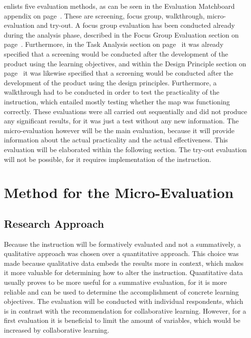 \documentclass[11pt,twoside]{report} %
\begin{document}
 enlists five evaluation methods, as can be seen in the Evaluation Matchboard appendix on page~\pageref{app:evamatchboard}. These are screening, focus group, walkthrough, micro-evaluation and try-out. A focus group evaluation has been conducted already during the analysis phase, described in the Focus Group Evaluation section on page~\pageref{ch:focusgroup}. Furthermore, in the Task Analysis section on page~\pageref{subch:testspecifications} it was already specified that a screening would be conducted after the development of the product using the learning objectives, and within the Design Principle section on page~\pageref{ch:designprinciples} it was likewise specified that a screening would be conducted after the development of the product using the design principles. Furthermore, a walkthrough had to be conducted in order to test the practicality of the instruction, which entailed mostly testing whether the map was functioning correctly. These evaluations were all carried out sequentially and did not produce any significant results, for it was just a test without any new information. The micro-evaluation however will be the main evaluation, because it will provide information about the actual practicality and the actual effectiveness. This evaluation will be elaborated within the following section. The try-out evaluation will not be possible, for it requires implementation of the instruction.

\chapter{Method for the Micro-Evaluation}
\label{ch:methodevaluation}

\section{Research Approach}

Because the instruction will be formatively evaluated and not a summatively, a qualitative approach was chosen over a quantitative approach. This choice was made because qualitative data embeds the results more in context, which makes it more valuable for determining how to alter the instruction. Quantitative data usually proves to be more useful for a summative evaluation, for it is more reliable and can be used to determine the accomplishment of concrete learning objectives. The evaluation will be conducted with individual respondents, which is in contrast with the recommendation for collaborative learning. However, for a first evaluation it is beneficial to limit the amount of variables, which would be increased by collaborative learning.
\end{document}
